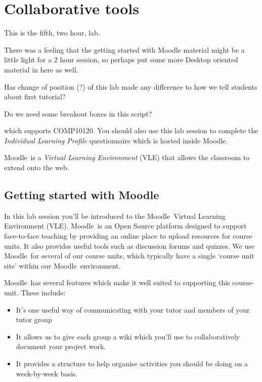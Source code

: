 \chapter{Collaborative tools}
\newcommand{\moodle}{\textsf{Moodle}}
\newcommand{\Moodle}{\textsf{Moodle}}


\begin{note}
  This is the fifth, two hour, lab.

  There was a feeling that the getting started with Moodle material might be a little light for a 2 hour session, so perhaps put some more Desktop oriented material in here as well.

  Has change of position (?) of this lab made any difference to how we tell students about first tutorial?

  Do we need some breakout boxes in this script?
  
  
  which supports COMP10120. You should also use this lab session to complete the \emph{Individual Learning Profile} questionnaire which is hosted inside \moodle.

\moodle\ is a \emph{Virtual Learning Environment} (VLE) that allows the classroom to extend onto the web.
  
\end{note}


\section{Getting started with \moodle}
\label{sec:introduction-moodle}

In this lab session you'll be introduced to the \moodle\ Virtual Learning Environment (VLE). \moodle\ is an Open Source platform designed to support face-to-face teaching by providing an online place to upload resources for course units. It also provides useful  tools such as discussion forums and quizzes. We use \moodle\ for several of our course units, which typically have a single `course unit site' within our \moodle\ environment.

\moodle\ has several features which make it well suited to supporting this course-unit. These include:
\begin{itemize}
\item It's one useful way of communicating with your tutor and members of your tutor group 
\item It allows us to give each group a wiki which you'll use to collaboratively document your project work.
\item It provides a structure to help organise activities you should be doing on a week-by-week basis.
\end{itemize}

